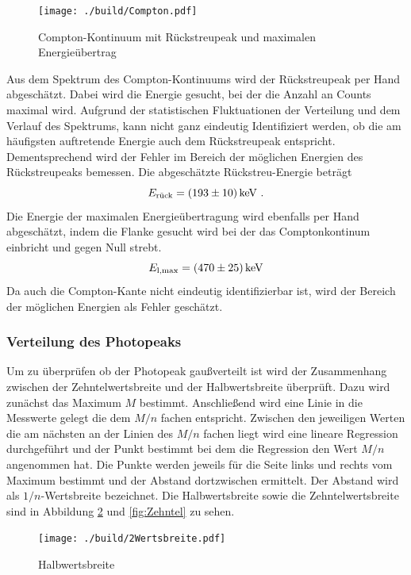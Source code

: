 \begin{figure}[htpb]
  \centering
  \texttt{[image: ./build/Compton.pdf]}
  \caption{Compton-Kontinuum mit Rückstreupeak und maximalen Energieübertrag}
  \label{fig:Compt}
\end{figure}

Aus dem Spektrum des Compton-Kontinuums wird der Rückstreupeak per Hand abgeschätzt. Dabei wird die Energie gesucht, bei der die Anzahl an Counts maximal wird. Aufgrund der statistischen Fluktuationen der Verteilung und dem Verlauf des Spektrums, kann nicht ganz eindeutig Identifiziert werden, ob die am häufigsten auftretende Energie auch dem Rückstreupeak entspricht. Dementsprechend wird der Fehler im Bereich der möglichen Energien des Rückstreupeaks bemessen. Die abgeschätzte Rückstreu-Energie beträgt
\begin{equation}
  E_\text{rück} = (\num{193 +- 10}) \, \text{keV} \ .
  \label{eqn:KanExp}
\end{equation}
Die Energie der maximalen Energieübertragung wird ebenfalls per Hand abgeschätzt, indem die Flanke gesucht wird bei der das Comptonkontinum einbricht und gegen Null strebt.
\begin{equation}
  E_\text{l,max} = (\num{470 +- 25}) \, \text{keV}
  \label{eqn:RückExp}
\end{equation}
Da auch die Compton-Kante nicht eindeutig identifizierbar ist, wird der Bereich der möglichen Energien als Fehler geschätzt.


\subsubsection{Verteilung des Photopeaks}
Um zu überprüfen ob der Photopeak gaußverteilt ist wird der Zusammenhang zwischen der Zehntelwertsbreite und der Halbwertsbreite überprüft. Dazu wird zunächst das Maximum $M$ bestimmt. Anschließend wird eine Linie in die Messwerte gelegt die dem $M/n$ fachen entspricht. Zwischen den jeweiligen Werten die am nächsten an der Linien des $M/n$ fachen liegt wird eine lineare Regression durchgeführt und der Punkt bestimmt bei dem die Regression den Wert $M/n$ angenommen hat. Die Punkte werden jeweils für die Seite links und rechts vom Maximum bestimmt und der Abstand dortzwischen ermittelt. Der Abstand wird als $1/n$-Wertsbreite bezeichnet.
Die Halbwertsbreite sowie die Zehntelwertsbreite sind in Abbildung \ref{fig:Halb} und \ref{fig:Zehntel} zu sehen.

\begin{figure}[h]
  \centering
  \texttt{[image: ./build/2Wertsbreite.pdf]}
  \caption{Halbwertsbreite}
  \label{fig:Halb}
\end{figure}

